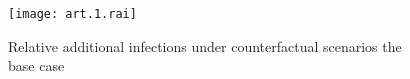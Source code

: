 \begin{figure}[h]
  \centering\texttt{[image: art.1.rai]}
  \caption{Relative additional infections under counterfactual scenarios \vs the base case}
  \label{fig:art.1.rai}
\end{figure}

